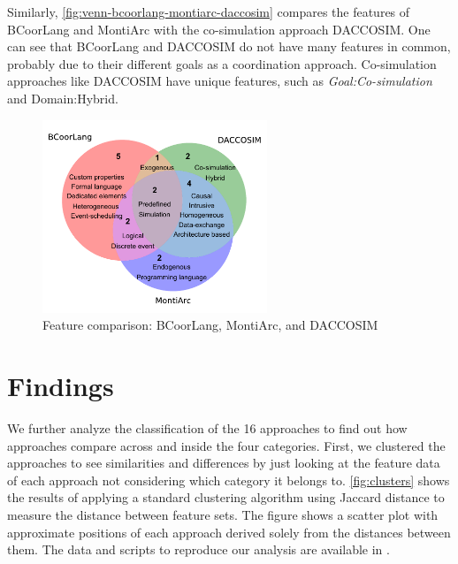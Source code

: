 \documentclass[runningheads]{llncs}
\begin{document}
Similarly, \autoref{fig:venn-bcoorlang-montiarc-daccosim} compares the features of BCoorLang and MontiArc with the co-simulation approach DACCOSIM.
One can see that BCoorLang and DACCOSIM do not have many features in common, probably due to their different goals as a coordination approach.
Co-simulation approaches like DACCOSIM have unique features, such as \textit{Goal:Co-simulation} and \textsf{Domain:Hybrid}.

\begin{figure}[ht]
	\centering
	\includegraphics[width=0.6\textwidth]{images/venn_bcoorlang_montiarc_daccosim}
	\caption{Feature comparison: BCoorLang, MontiArc, and DACCOSIM}
	\label{fig:venn-bcoorlang-montiarc-daccosim}
\end{figure}

\section{Findings} \label{sec:findings}

We further analyze the classification of the 16 approaches to find out how approaches compare across and inside the four categories.
First, we clustered the approaches to see similarities and differences by just looking at the feature data of each approach not considering which category it belongs to.
\autoref{fig:clusters} shows the results of applying a standard clustering algorithm using Jaccard distance to measure the distance between feature sets.
The figure shows a scatter plot with approximate positions of each approach derived solely from the distances between them.
The data and scripts to reproduce our analysis are available in \cite{timkrauterArtifactsCoordination2024}.
\end{document}
